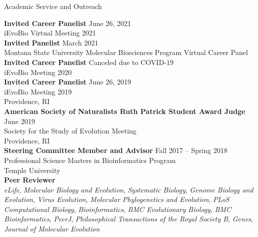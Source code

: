 \documentclass{resume} %
\begin{document}
\vspace*{0.5cm}
\begin{rSection}{Academic Service and Outreach}
\vspace*{0.25cm}

\textbf{Invited Career Panelist} \hfill June 26, 2021 \\  iEvoBio Virtual Meeting 2021 \\

\textbf{Invited Panelist} \hfill March 2021 \\ Montana State University Molecular Biosciences Program Virtual Career Panel \\

\textbf{Invited Career Panelist} \hfill Canceled due to COVID-19 \\  iEvoBio Meeting 2020 \\

\textbf{Invited Career Panelist} \hfill June 26, 2019 \\ iEvoBio Meeting 2019 \\ Providence, RI \\

\textbf{American Society of Naturalists Ruth Patrick Student Award Judge} \hfill June 2019  \\ Society for the Study of Evolution Meeting \\ Providence, RI \\

\textbf{Steering Committee Member and Advisor} \hfill Fall 2017 -- Spring 2018 \\ Professional Science Masters in Bioinformatics Program \\ Temple University \\


\textbf{Peer Reviewer} \\ \emph{eLife}, \emph{Molecular Biology and Evolution}, \emph{Systematic Biology}, \emph{Genome Biology and Evolution}, \emph{Virus Evolution}, \emph{Molecular Phylogenetics and Evolution}, \emph{PLoS Computational Biology}, \emph{Bioinformatics}, \emph{BMC Evolutionary Biology},  \emph{BMC Bioinformatics}, \emph{PeerJ}, \emph{Philosophical Transactions of the Royal Society B}, \emph{Genes}, \emph{Journal of Molecular Evolution}

\end{rSection}
\vspace*{0.5cm}
\end{document}
